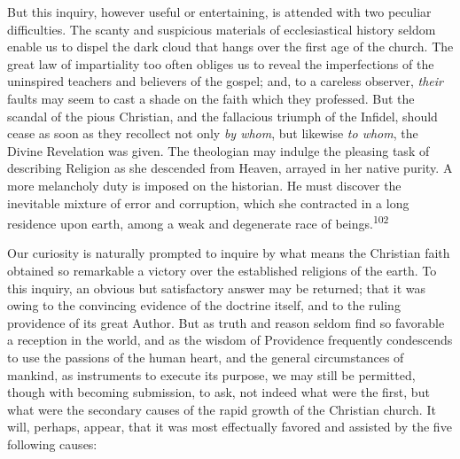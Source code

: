 But this inquiry, however useful or entertaining, is attended
with two peculiar difficulties. The scanty and suspicious
materials of ecclesiastical history seldom enable us to dispel
the dark cloud that hangs over the first age of the church. The
great law of impartiality too often obliges us to reveal the
imperfections of the uninspired teachers and believers of the
gospel; and, to a careless observer, \textit{their} faults may seem to
cast a shade on the faith which they professed. But the scandal
of the pious Christian, and the fallacious triumph of the
Infidel, should cease as soon as they recollect not only \textit{by
whom}, but likewise \textit{to whom}, the Divine Revelation was given.
The theologian may indulge the pleasing task of describing
Religion as she descended from Heaven, arrayed in her native
purity. A more melancholy duty is imposed on the historian. He
must discover the inevitable mixture of error and corruption,
which she contracted in a long residence upon earth, among a weak
and degenerate race of beings.\textsuperscript{102}


Our curiosity is naturally prompted to inquire by what means the
Christian faith obtained so remarkable a victory over the
established religions of the earth. To this inquiry, an obvious
but satisfactory answer may be returned; that it was owing to the
convincing evidence of the doctrine itself, and to the ruling
providence of its great Author. But as truth and reason seldom
find so favorable a reception in the world, and as the wisdom of
Providence frequently condescends to use the passions of the
human heart, and the general circumstances of mankind, as
instruments to execute its purpose, we may still be permitted,
though with becoming submission, to ask, not indeed what were the
first, but what were the secondary causes of the rapid growth of
the Christian church. It will, perhaps, appear, that it was most
effectually favored and assisted by the five following causes:


